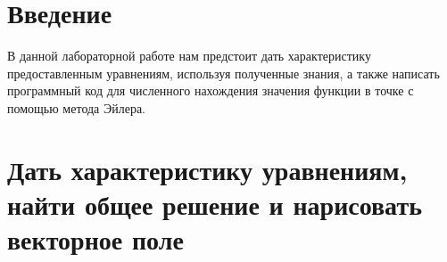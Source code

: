 \documentclass[14pt, a4paper]{extarticle}
\begin{document}
	
	
	\tableofcontents
	\pagebreak
	
	\section{Введение}
		В данной лабораторной работе нам предстоит дать характеристику предоставленным уравнениям, используя полученные знания, а также написать программный код для численного нахождения значения функции в точке с помощью метода Эйлера. 
	\pagebreak
	
	\section{Дать характеристику уравнениям, найти общее решение и нарисовать векторное поле}
\end{document}
